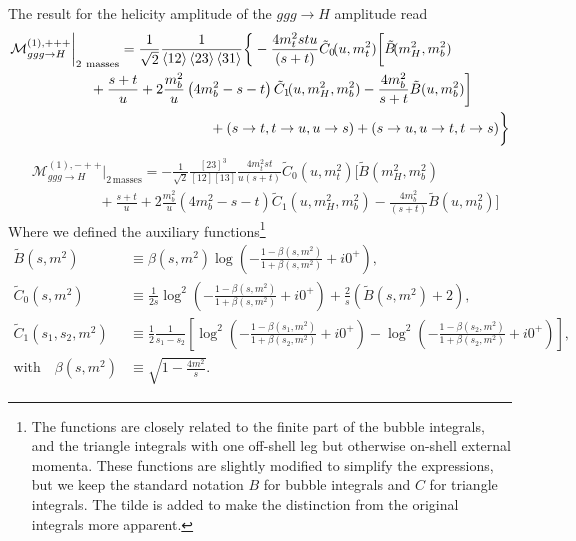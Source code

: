 The result for the helicity amplitude of the $ggg \rightarrow H$ amplitude read
\begin{equation}
\begin{split}
&\mathcal{M}^{(1),+++}_{ggg \rightarrow H} \bigg \vert_{2\ \text{masses}} = \frac{1}{\sqrt{2}} \frac{1}{\braket{12}\braket{23} \braket{31}} \bigg \lbrace -  \frac{4 m_t^2 s t u}{(s + t)} \tilde{C}_0\!(u, m_t^2) \bigg [ \tilde{B}\!(m_H^2, m_b^2)  \\
& \hspace{2cm} + \frac{s + t}{u} + 2 \frac{m_b^2}{u} \left( 4 m_b^2 - s - t \right) \tilde{C}_1\!(u, m_H^2, m_b^2) - \frac{4 m_b^2}{s + t} \tilde{B}(u, m_b^2)  \bigg ] \\
& \hspace{5cm} + (s \rightarrow t, t \rightarrow u, u \rightarrow s) + (s \rightarrow u, u \rightarrow t, t \rightarrow s)\bigg \rbrace
\label{eq:5:ggg_ppp}
\end{split}
\end{equation}
%
%
\begin{equation}
\begin{split}
&\mathcal{M}^{(1),-++}_{ggg \rightarrow H} \bigg \vert_{2\, \text{masses}} = -\frac{1}{\sqrt{2}} \frac{[23]^3}{[12][13]} \frac{4 m_t^2 s t }{u(s + t)} \tilde{C}_0\!(u, m_t^2) \bigg [ \tilde{B}\!(m_H^2, m_b^2) \\
& \hspace{2cm} + \frac{s + t}{u} + 2 \frac{m_b^2}{u} \left(4 m_b^2 - s - t\right) \tilde{C}_1\!(u, m_H^2, m_b^2) - \frac{4 m_b^2}{(s + t)} \tilde{B}\!(u, m_b^2) \bigg ]
\label{eq:5:ggg_mpp}
\end{split}
\end{equation}
Where we defined the auxiliary functions\footnote{The functions are closely related to the finite part of the bubble integrals, and the triangle integrals with one off-shell leg but otherwise on-shell external momenta. These functions are slightly modified to simplify the expressions, but we keep the standard notation $B$ for bubble integrals and $C$ for triangle integrals. The tilde is added to make the distinction from the original integrals more apparent.}
\begin{equation}
\begin{split}
\tilde{B}\!(s, m^2) &\equiv \beta(s, m^2) \log\!\left(- \frac{1 - \beta(s, m^2)}{1 + \beta(s, m^2)} + i 0^+ \right), \\
\tilde{C}_0\!(s, m^2) &\equiv \frac{1}{2 s} \log^2\!\left(- \frac{1 - \beta(s, m^2)}{1 + \beta(s, m^2)} + i 0^+ \right) + \frac{2}{s} \left(\tilde{B}\!(s, m^2) + 2 \right), \\
\tilde{C}_1\!(s_1, s_2, m^2) &\equiv \frac{1}{2} \frac{1}{s_1 - s_2} \left[ \log^2\!\left(-\frac{1 - \beta(s_1, m^2)}{1 + \beta(s_2, m^2)} + i 0^+ \right) - \log^2\!\left(- \frac{1 - \beta(s_2, m^2)}{1 + \beta(s_2, m^2)} + i0^+\right) \right], \\
\text{with} \quad \beta(s, m^2) &\equiv \sqrt{1 - \frac{4 m^2}{s}}.
\label{eq:5:function_definitions}
\end{split}
\end{equation}
